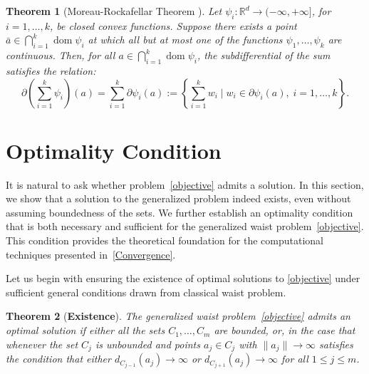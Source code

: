 \documentclass[12pt]{article}
\theoremstyle{plain}
\newtheorem{theorem}{Theorem}[section]
\theoremstyle{definition}
\begin{document}
\begin{theorem}[Moreau-Rockafellar Theorem {\cite[Corollary 3.21, p. 93]{MoNa23}}]\label{sumofsubgradient}
	Let \( \psi_i: \mathbb{R}^d \to (-\infty, +\infty] \), for \( i = 1, \dots, k \), be closed convex functions. Suppose there exists a point \( \bar{a} \in \bigcap_{i=1}^{k} \operatorname{dom} \psi_i \) at which all but at most one of the functions \( \psi_1, \dots, \psi_k \) are continuous. Then, for all \( a \in \bigcap_{i=1}^{k} \operatorname{dom} \psi_i \), the subdifferential of the sum satisfies the relation:
	\[
	\partial \left( \sum_{i=1}^{k} \psi_i \right)(a) = \sum_{i=1}^{k} \partial \psi_i(a) := \left\{ \sum_{i=1}^{k} w_i \mid w_i \in \partial \psi_i(a), \; i = 1, \dots, k \right\}.
	\]
\end{theorem}




\section{Optimality Condition}\label{Optimality_Conditions}
It is natural to ask whether problem~\eqref{objective} admits a solution. In this section, we show that a solution to the generalized problem indeed exists, even without assuming boundedness of the sets. We further establish an optimality condition that is both necessary and sufficient for the generalized waist problem~\eqref{objective}. This condition provides the theoretical foundation for the computational techniques presented in~\ref{Convergence}.

Let us begin with ensuring the existence of optimal solutions to \eqref{objective} under sufficient general conditions drawn from classical waist problem.

\begin{theorem}[\textbf{Existence}]\label{Existenceofsolution}
	The generalized waist problem~\ref{objective} admits an optimal solution if either all the sets \(C_1, \dots, C_m\) are bounded, or, in the case that whenever the set \(C_j\) is unbounded and points $a_j \in C_j$ with \(\|a_j\| \to \infty\) satisfies the condition that either $d_{C_{j-1}}(a_j) \to \infty$  or $d_{C_{j+1}}(a_j) \to \infty$ for all \(1 \leq j \leq m\).
\end{theorem}
\end{document}
